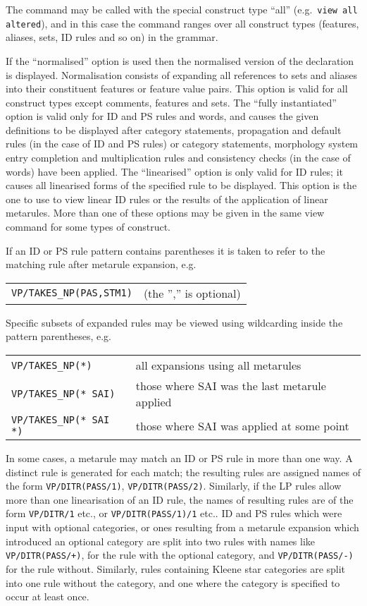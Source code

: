 The command may be called with the special construct type ``all'' (e.g.\ 
{\tt view all altered}), and in this case the command ranges over all
construct types (features, aliases, sets, ID rules and so on) in the
grammar. 

If the ``normalised'' option is used then the normalised version of the
declaration is displayed.  Normalisation consists of expanding all
references to sets and aliases into their constituent features or
feature value pairs. This option is valid for all construct types except
comments, features and sets.  The ``fully instantiated'' option is valid
only for ID and PS rules and words, and causes the given definitions to
be displayed after category statements, propagation and default rules
(in the case of ID and PS rules) or category statements, morphology
system entry completion and multiplication rules and consistency checks
(in the case of words) have been applied.
The ``linearised'' option is only valid for ID rules; it
causes all linearised forms of the specified rule to be displayed. This
option is the one to use to view linear ID rules or the results of the
application of linear metarules. More than one of these options may be
given in the same view command for some types of construct. 

If an ID or PS rule pattern contains parentheses it is taken to refer to
the matching rule after metarule expansion, e.g.
\begin{display}
\begin{tabular}{ll}
{\tt VP/TAKES\_NP(PAS,STM1)} & (the '','' is optional)
\end{tabular}
\end{display}
Specific subsets of expanded rules may be viewed using wildcarding
inside the pattern parentheses, e.g.
\begin{display}
\begin{tabular}{ll}
{\tt VP/TAKES\_NP(*)}       & all expansions using all metarules\\
{\tt VP/TAKES\_NP(* SAI)}   & those where SAI was the last metarule applied\\
{\tt VP/TAKES\_NP(* SAI *)} & those where SAI was applied at some point
\end{tabular}
\end{display}
In some cases, a metarule may match an ID or PS rule in more than one
way. A distinct rule is generated for each match; the resulting rules
are assigned names of the form {\tt VP/DITR(PASS/1)},
{\tt VP/DITR(PASS/2)}.  Similarly, if the LP rules allow more than one
linearisation of an ID rule, the names of resulting rules are of the
form {\tt VP/DITR/1} etc., or {\tt VP/DITR(PASS/1)/1} etc.. ID
and PS rules which were input with optional categories, or ones
resulting from a metarule expansion which introduced an optional
category are split into two rules with names like {\tt VP/DITR(PASS/+)},
for the rule with the optional category, and {\tt VP/DITR(PASS/-)}
for the rule without.  Similarly, rules containing
Kleene star categories are split into one rule without the category, and
one where the category is specified to occur at least once.

